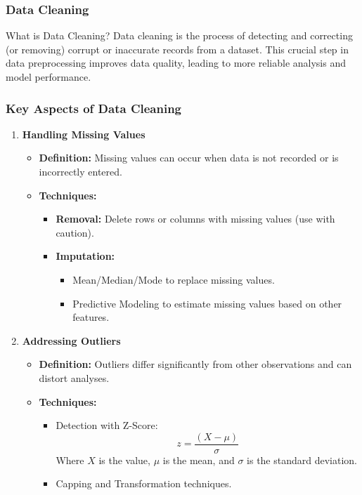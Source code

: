 \documentclass[aspectratio=169]{beamer}
\begin{document}
\begin{frame}[fragile]
    \frametitle{Data Cleaning}
    \begin{block}{What is Data Cleaning?}
        Data cleaning is the process of detecting and correcting (or removing) corrupt or inaccurate records from a dataset. 
        This crucial step in data preprocessing improves data quality, leading to more reliable analysis and model performance.
    \end{block}
\end{frame}

\begin{frame}[fragile]
    \frametitle{Key Aspects of Data Cleaning}
    \begin{enumerate}
        \item \textbf{Handling Missing Values}
        \begin{itemize}
            \item \textbf{Definition:} Missing values can occur when data is not recorded or is incorrectly entered.
            \item \textbf{Techniques:}
            \begin{itemize}
                \item \textbf{Removal:} Delete rows or columns with missing values (use with caution).
                \item \textbf{Imputation:}
                \begin{itemize}
                    \item Mean/Median/Mode to replace missing values.
                    \item Predictive Modeling to estimate missing values based on other features.
                \end{itemize}
            \end{itemize}
        \end{itemize}

        \item \textbf{Addressing Outliers}
        \begin{itemize}
            \item \textbf{Definition:} Outliers differ significantly from other observations and can distort analyses.
            \item \textbf{Techniques:}
            \begin{itemize}
                \item Detection with Z-Score:
                \begin{equation}
                    z = \frac{(X - \mu)}{\sigma}
                \end{equation}
                Where \(X\) is the value, \(\mu\) is the mean, and \(\sigma\) is the standard deviation.
                \item Capping and Transformation techniques.
            \end{itemize}
        \end{itemize}
    \end{enumerate}
\end{frame}
\end{document}
